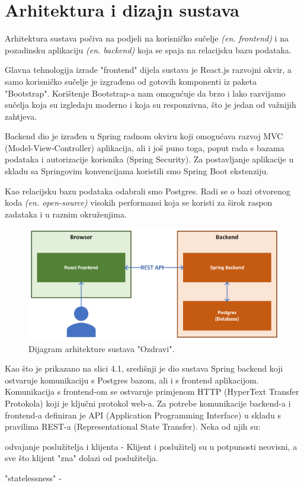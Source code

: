 \chapter{Arhitektura i dizajn sustava}
		Arhitektura sustava počiva na podjeli na korisničko sučelje \textit{(en. frontend)} i na pozadinsku aplikaciju \textit{(en. backend)} koja se spaja na relacijsku bazu podataka.

		Glavna tehnologija izrade "frontend" dijela sustava je React.js razvojni okvir, a samo korisničko sučelje je izgrađeno od gotovih komponenti iz paketa "Bootstrap". Korištenje Bootstrap-a nam omogućuje da brzo i lako razvijamo sučelja koja su izgledaju moderno i koja su responzivna, 
		što je jedan od važnijih zahtjeva. 

		Backend dio je izrađen u Spring radnom okviru koji omogućava razvoj MVC (Model-View-Controller) aplikacija, ali i još puno toga, poput rada s bazama podataka i autorizacije korisnika (Spring Security). 
		Za postavljanje aplikacije u skladu sa Springovim konvencijama koristili smo Spring Boot ekstenziju.

		Kao relacijsku bazu podataka odabrali smo Postgres. Radi se o bazi otvorenog koda \textit{(en. open-source)} visokih performansi koja se koristi za širok raspon zadataka i u raznim okruženjima.

		\begin{figure}[H]
			\includegraphics[width=\textwidth]{slike/architecture.png} 
			\caption{Dijagram arhitekture sustava "Ozdravi".}
		\end{figure}

		Kao što je prikazano na slici 4.1, središnji je dio sustava Spring backend koji ostvaruje komunikaciju s Postgres bazom, ali i s frontend aplikacijom. Komunikacija s frontend-om se ostvaruje primjenom
		HTTP (HyperText Transfer Protokola) koji je ključni protokol web-a. Za potrebe komunikacije backend-a i frontend-a definiran je API (Application Programming Interface) u skladu s pravilima REST-a (Representational State Transfer). Neka od njih su:
		\begin{packed_item}
			\item odvajanje poslužitelja i klijenta - Klijent i poslužitelj su u potpunosti neovisni, a sve što klijent "zna" dolazi od poslužitelja.
			\item "statelessness" - 
		\end{packed_item}

